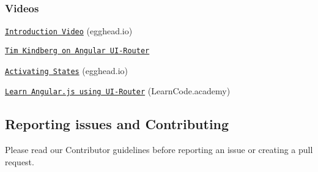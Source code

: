 \subsubsection*{Videos}


\begin{DoxyItemize}
\item \href{https://egghead.io/lessons/angularjs-introduction-ui-router}{\tt Introduction Video} (egghead.\+io)
\item \href{https://www.youtube.com/watch?v=lBqiZSemrqg}{\tt Tim Kindberg on Angular U\+I-\/\+Router}
\item \href{https://egghead.io/lessons/angularjs-ui-router-activating-states}{\tt Activating States} (egghead.\+io)
\item \href{http://youtu.be/QETUuZ27N0w}{\tt Learn Angular.\+js using U\+I-\/\+Router} (Learn\+Code.\+academy)
\end{DoxyItemize}

\subsection*{Reporting issues and Contributing}

Please read our Contributor guidelines before reporting an issue or creating a pull request. 